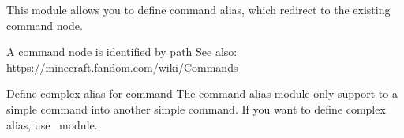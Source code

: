 
This module allows you to define command alias, which redirect to the existing command node.

\begin{note}{A command node is identified by path}
   See also: \url{https://minecraft.fandom.com/wiki/Commands}
\end{note}

\begin{tips}{Define complex alias for command}
    The command alias module only support to  a simple command into another simple command.
    If you want to define complex alias, use~ module.
\end{tips}

